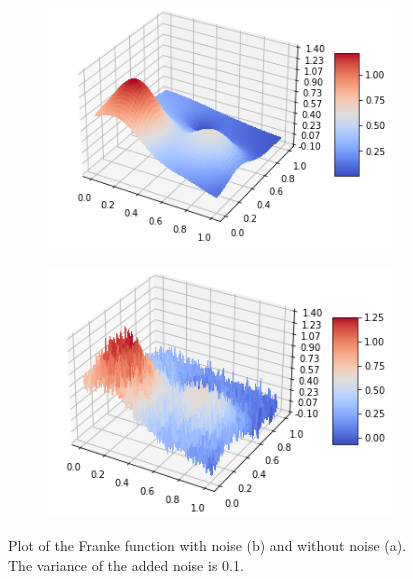 \begin{figure}[H]
\centering
\begin{subfigure}{.5\textwidth}
  \centering
  \includegraphics[width=.9\linewidth]{Images/franke_function.png}
  \caption{}
  \label{fig:franke}
\end{subfigure}%
\begin{subfigure}{.5\textwidth}
  \centering
  \includegraphics[width=.9\linewidth]{Images/franke_function_noise.png}
  \caption{}
  \label{fig:franke_noise}
\end{subfigure}
\caption{Plot of the Franke function with noise (b) and without noise (a). The variance of the added noise is 0.1.}
\label{fig:franke_function}
\end{figure}